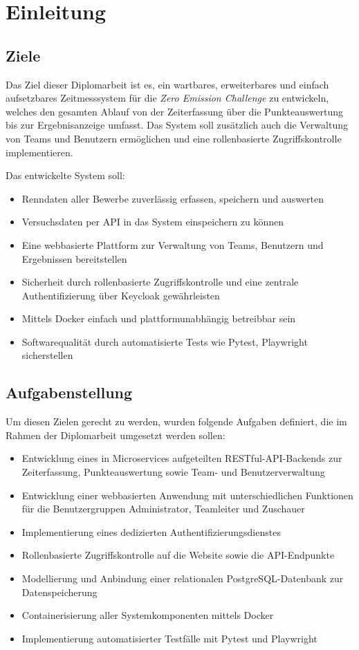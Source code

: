 \section{Einleitung}
\subsection{Ziele}

Das Ziel dieser Diplomarbeit ist es, ein wartbares, erweiterbares und einfach 
aufsetzbares Zeitmesssystem für die \textit{Zero Emission Challenge} zu entwickeln, 
welches den gesamten Ablauf von der Zeiterfassung über die Punkteauswertung bis zur Ergebnisanzeige umfasst.
Das System soll zusätzlich auch die Verwaltung von Teams und Benutzern ermöglichen und 
eine rollenbasierte Zugriffskontrolle implementieren.

Das entwickelte System soll:
\begin{itemize}
    \item Renndaten aller Bewerbe zuverlässig erfassen, speichern und auswerten
    \item Versuchsdaten per API in das System einspeichern zu können
    \item Eine webbasierte Plattform zur Verwaltung von Teams, Benutzern und 
          Ergebnissen bereitstellen
    \item Sicherheit durch rollenbasierte Zugriffskontrolle und eine zentrale 
          Authentifizierung über Keycloak gewährleisten
    \item Mittels Docker einfach und plattformunabhängig betreibbar sein
    \item Softwarequalität durch automatisierte Tests wie Pytest, Playwright sicherstellen
\end{itemize}
\newpage

\subsection{Aufgabenstellung}

Um diesen Zielen gerecht zu werden, wurden folgende Aufgaben definiert, die im Rahmen der Diplomarbeit umgesetzt werden sollen:

\begin{itemize}
      \item Entwicklung eines in Microservices aufgeteilten RESTful-API-Backends zur Zeiterfassung, Punkteauswertung sowie Team- und Benutzerverwaltung
      \item Entwicklung einer webbasierten Anwendung mit unterschiedlichen Funktionen für die Benutzergruppen Administrator, Teamleiter und Zuschauer
      \item Implementierung eines dedizierten Authentifizierungsdienstes
      \item Rollenbasierte Zugriffskontrolle auf die Website sowie die API-Endpunkte
      \item Modellierung und Anbindung einer relationalen PostgreSQL-Datenbank zur Datenspeicherung
      \item Containerisierung aller Systemkomponenten mittels Docker
      \item Implementierung automatisierter Testfälle mit Pytest und Playwright
\end{itemize}